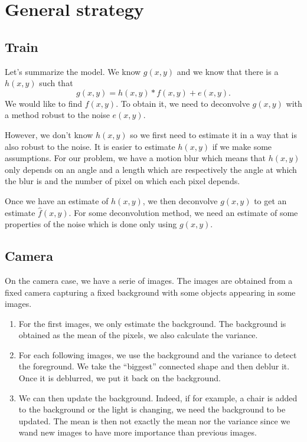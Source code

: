 \chapter{General strategy}
\section{Train}
Let's summarize the model.
We know $g(x,y)$ and we know that there is a $h(x,y)$ such that
\[ g(x,y) = h(x,y) * f(x,y) + e(x,y). \]
We would like to find $f(x,y)$.
To obtain it, we need to deconvolve $g(x,y)$ with a method
robust to the noise $e(x,y)$.

However, we don't know $h(x,y)$ so we first need to estimate it
in a way that is also robust to the noise.
It is easier to estimate $h(x,y)$ if we make some assumptions.
For our problem, we have a motion blur which means that
$h(x,y)$ only depends on an angle and a length which are
respectively the angle at which the blur is and the number of
pixel on which each pixel depends.

Once we have an estimate of $h(x,y)$, we then deconvolve
$g(x,y)$ to get an estimate $\hat{f}(x,y)$.
For some deconvolution method, we need an estimate of
some properties of the noise which is done only using $g(x,y)$.

\section{Camera}
On the camera case, we have a serie of images.
The images are obtained from a fixed camera capturing a fixed
background with some objects appearing in some images.
\begin{enumerate}
  \item For the first images, we only estimate the background.
    The background is obtained as the mean of the pixels,
    we also calculate the variance.
  \item For each following images, we use the background and the variance
    to detect the foreground.
    We take the ``biggest'' connected shape and then deblur it.
    Once it is deblurred, we put it back on the background.
  \item We can then update the background.
    Indeed, if for example, a chair is added to the background
    or the light is changing, we need the background to be updated.
    The mean is then not exactly the mean nor the variance
    since we wand new images to have more importance than previous
    images.
\end{enumerate}
